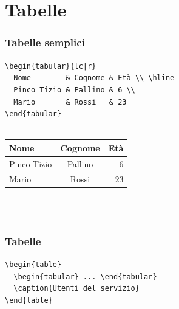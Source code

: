 \documentclass[aspectratio=169,compress]{beamer}
\begin{document}
\section{Tabelle}
\begin{frame}[fragile]\transfade\centering
  \frametitle{Tabelle semplici}
\verb!\begin{tabular}{lc|r}                   !\\
\verb!  Nome        & Cognome & Età \\ \hline !\\
\verb!  Pinco Tizio & Pallino & 6 \\          !\\
\verb!  Mario       & Rossi   & 23            !\\
\verb!\end{tabular}                           !\\~\\
  \begin{tabular}{lc|r}
    Nome & Cognome & Età \\ \hline
    Pinco Tizio & Pallino & 6 \\
    Mario & Rossi & 23
  \end{tabular}\\~
\end{frame}
\begin{frame}[fragile]\transfade\centering
  \frametitle{Tabelle}
\verb!\begin{table}                       !\\
\verb!  \begin{tabular} ... \end{tabular} !\\
\verb!  \caption{Utenti del servizio}     !\\
\verb!\end{table}                         !\\
  ~\\
\end{frame}
\end{document}
